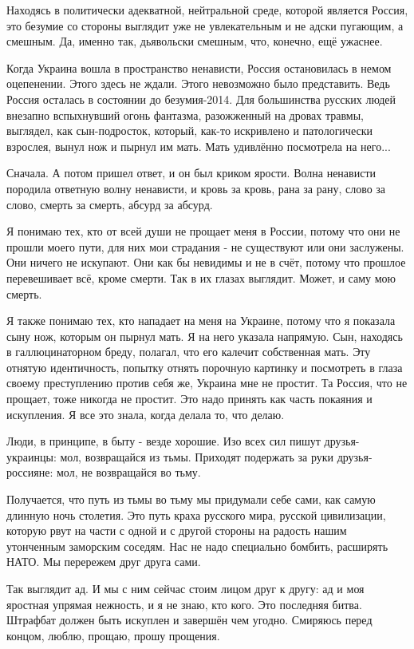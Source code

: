 Находясь в политически адекватной, нейтральной среде, которой является Россия,
это безумие со стороны выглядит уже не увлекательным и не адски пугающим, а
смешным. Да, именно так, дьявольски смешным, что, конечно, ещё ужаснее.

Когда Украина вошла в пространство ненависти, Россия остановилась в немом
оцепенении. Этого здесь не ждали. Этого невозможно было представить. Ведь
Россия осталась в состоянии до безумия-2014. Для большинства русских людей
внезапно вспыхнувший огонь фантазма, разожженный на дровах травмы, выглядел,
как сын-подросток, который, как-то искривлено и патологически взрослея, вынул
нож и пырнул им мать. Мать удивлённо посмотрела на него...

Сначала. А потом пришел ответ, и он был криком ярости. Волна ненависти породила
ответную волну ненависти, и кровь за кровь, рана за рану, слово за слово,
смерть за смерть, абсурд за абсурд. 

Я понимаю тех, кто от всей души не прощает меня в России, потому что они не
прошли моего пути, для них мои страдания - не существуют или они заслужены. Они
ничего не искупают. Они как бы невидимы и не в счёт, потому что прошлое
перевешивает всё, кроме смерти. Так в их глазах выглядит. Может, и саму мою
смерть.

Я также понимаю тех, кто нападает на меня на Украине, потому что я показала
сыну нож, которым он пырнул мать. Я на него указала напрямую. Сын, находясь в
галлюцинаторном бреду, полагал, что его калечит собственная мать. Эту отнятую
идентичность, попытку отнять порочную картинку и посмотреть в глаза своему
преступлению против себя же, Украина мне не простит. Та Россия, что не прощает,
тоже никогда не простит. Это надо принять как часть покаяния и искупления. Я
все это знала, когда делала то, что делаю.

Люди, в принципе, в быту - везде хорошие. Изо всех сил пишут друзья-украинцы:
мол, возвращайся из тьмы. Приходят подержать за руки друзья-россияне: мол, не
возвращайся во тьму.

Получается, что путь из тьмы во тьму мы придумали себе сами, как самую длинную
ночь столетия. Это путь краха русского мира, русской цивилизации, которую рвут
на части с одной и с другой стороны на радость нашим утонченным заморским
соседям. Нас не надо специально бомбить, расширять НАТО. Мы перережем друг
друга сами.

Так выглядит ад. И мы с ним сейчас стоим лицом друг к другу: ад и моя яростная
упрямая нежность, и я не знаю, кто кого. Это последняя битва. Штрафбат должен
быть искуплен и завершён чем угодно. Смиряюсь перед концом, люблю, прощаю,
прошу прощения.
